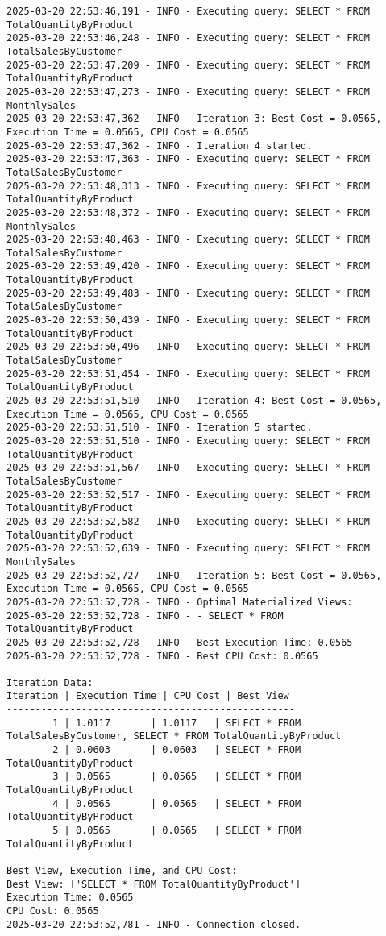 \begin{lstlisting}[style=pythonstyle, caption={Output from python code }, label={lst:pso_query_optimization}]
2025-03-20 22:53:46,191 - INFO - Executing query: SELECT * FROM TotalQuantityByProduct
2025-03-20 22:53:46,248 - INFO - Executing query: SELECT * FROM TotalSalesByCustomer
2025-03-20 22:53:47,209 - INFO - Executing query: SELECT * FROM TotalQuantityByProduct
2025-03-20 22:53:47,273 - INFO - Executing query: SELECT * FROM MonthlySales
2025-03-20 22:53:47,362 - INFO - Iteration 3: Best Cost = 0.0565, Execution Time = 0.0565, CPU Cost = 0.0565
2025-03-20 22:53:47,362 - INFO - Iteration 4 started.
2025-03-20 22:53:47,363 - INFO - Executing query: SELECT * FROM TotalSalesByCustomer
2025-03-20 22:53:48,313 - INFO - Executing query: SELECT * FROM TotalQuantityByProduct
2025-03-20 22:53:48,372 - INFO - Executing query: SELECT * FROM MonthlySales
2025-03-20 22:53:48,463 - INFO - Executing query: SELECT * FROM TotalSalesByCustomer
2025-03-20 22:53:49,420 - INFO - Executing query: SELECT * FROM TotalQuantityByProduct
2025-03-20 22:53:49,483 - INFO - Executing query: SELECT * FROM TotalSalesByCustomer
2025-03-20 22:53:50,439 - INFO - Executing query: SELECT * FROM TotalQuantityByProduct
2025-03-20 22:53:50,496 - INFO - Executing query: SELECT * FROM TotalSalesByCustomer
2025-03-20 22:53:51,454 - INFO - Executing query: SELECT * FROM TotalQuantityByProduct
2025-03-20 22:53:51,510 - INFO - Iteration 4: Best Cost = 0.0565, Execution Time = 0.0565, CPU Cost = 0.0565
2025-03-20 22:53:51,510 - INFO - Iteration 5 started.
2025-03-20 22:53:51,510 - INFO - Executing query: SELECT * FROM TotalQuantityByProduct
2025-03-20 22:53:51,567 - INFO - Executing query: SELECT * FROM TotalSalesByCustomer
2025-03-20 22:53:52,517 - INFO - Executing query: SELECT * FROM TotalQuantityByProduct
2025-03-20 22:53:52,582 - INFO - Executing query: SELECT * FROM TotalQuantityByProduct
2025-03-20 22:53:52,639 - INFO - Executing query: SELECT * FROM MonthlySales
2025-03-20 22:53:52,727 - INFO - Iteration 5: Best Cost = 0.0565, Execution Time = 0.0565, CPU Cost = 0.0565
2025-03-20 22:53:52,728 - INFO - Optimal Materialized Views:
2025-03-20 22:53:52,728 - INFO - - SELECT * FROM TotalQuantityByProduct
2025-03-20 22:53:52,728 - INFO - Best Execution Time: 0.0565
2025-03-20 22:53:52,728 - INFO - Best CPU Cost: 0.0565

Iteration Data:
Iteration | Execution Time | CPU Cost | Best View
--------------------------------------------------
        1 | 1.0117       | 1.0117   | SELECT * FROM TotalSalesByCustomer, SELECT * FROM TotalQuantityByProduct
        2 | 0.0603       | 0.0603   | SELECT * FROM TotalQuantityByProduct
        3 | 0.0565       | 0.0565   | SELECT * FROM TotalQuantityByProduct
        4 | 0.0565       | 0.0565   | SELECT * FROM TotalQuantityByProduct
        5 | 0.0565       | 0.0565   | SELECT * FROM TotalQuantityByProduct

Best View, Execution Time, and CPU Cost:
Best View: ['SELECT * FROM TotalQuantityByProduct']
Execution Time: 0.0565
CPU Cost: 0.0565
2025-03-20 22:53:52,781 - INFO - Connection closed.

\end{lstlisting}